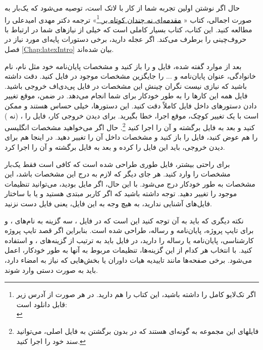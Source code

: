  حال اگر نوشتن \پ اولین تجربه شما از کار با لاتک است، توصیه می‌شود که یک‌بار به صورت اجمالی، کتاب «%
\href{http://www.tug.ctan.org/tex-archive/info/lshort/persian/lshort.pdf}{مقدمه‌ای نه چندان کوتاه بر
\lr{\LaTeXe}}\footnote{اگر تک‌لایو کامل را داشته باشید، این کتاب را هم دارید. در هر صورت از آدرس زیر قابل دانلود است:\\
}»
   ترجمه دکتر مهدی امیدعلی را مطالعه کنید. این کتاب، کتاب بسیار کاملی است که خیلی از نیازهای شما در ارتباط با حروف‌چینی را برطرف می‌کند.
اگر عجله دارید، برخی دستورات پایه‌ای مورد نیاز در فصل \ref{Chap:latexIntro} بیان شده‌اند.
 
 
بعد از موارد گفته شده، فایل 
و
را باز کنید و مشخصات پایان‌نامه خود مثل نام، نام خانوادگی، عنوان پایان‌نامه و ... را جایگزین مشخصات موجود در فایل
 کنید. دقت داشته باشید که نیازی نیست 
نگران چینش این مشخصات در فایل پی‌دی‌اف خروجی باشید. فایل 
همه این کارها را به طور خودکار برای شما انجام می‌دهد. در ضمن، موقع تغییر دادن دستورهای داخل فایل
 کاملاً دقت کنید. این دستورها، خیلی حساس هستند و ممکن است با یک تغییر کوچک، موقع اجرا، خطا بگیرید. برای دیدن خروجی کار، فایل 
 را 
، 
(نه 
)
کنید و بعد به فایل 
برگشته و آن را اجرا کنید
\footnote{فایلهای این مجموعه به گونه‌ای هستند که در   بدون برگشتن به فایل اصلی، می‌توانید سند خود را اجرا کنید. }.
 حال اگر می‌خواهید مشخصات انگلیسی \پ را هم عوض کنید، فایل 
را باز کنید و مشخصات داخل آن را تغییر دهید.%
 در اینجا هم برای دیدن خروجی، باید این فایل را 
کرده و بعد به فایل 
برگشته و آن را اجرا کرد.

برای راحتی بیشتر، 
فایل 
طوری طراحی شده است که کافی است فقط  یک‌بار مشخصات \پ  را وارد کنید. هر جای دیگر که لازم به درج این مشخصات باشد، این مشخصات به طور خودکار درج می‌شود. با این حال، اگر مایل بودید، می‌توانید تنظیمات موجود را تغییر دهید. توجه داشته باشید که اگر کاربر مبتدی هستید و یا با ساختار فایل‌های  
 آشنایی ندارید، به هیچ وجه به این فایل، یعنی فایل 
دست نزنید.

نکته دیگری که باید به آن توجه کنید این است که در فایل 
،
سه گزینه به نام‌های
،
و
برای تایپ پروژه، پایان‌نامه و رساله،
طراحی شده است. بنابراین اگر قصد تایپ پروژه کارشناسی، پایان‌نامه یا رساله را دارید، 
 در فایل 
باید به ترتیب از گزینه‌های
،
و
استفاده کنید. با انتخاب هر کدام از این گزینه‌ها، تنظیمات مربوط به آنها به طور خودکار، اعمل می‌شود. برخی صفحه‌ها مانند تاییدیه هیات داوران یا بخش‌هایی که نیاز به امضاء دارد، باید به صورت دستی وارد شوند.


